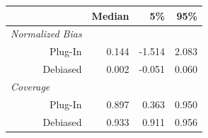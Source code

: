 \begin{tabular}{r|rrr}
\toprule
  & Median & 5\% & 95\%\\
\midrule
\multicolumn{1}{l|}{\textit{Normalized Bias}}\\
Plug-In & 0.144 & -1.514 & 2.083\\
Debiased & 0.002 & -0.051 & 0.060\\
\midrule
\multicolumn{1}{l|}{\textit{Coverage}}\\
Plug-In & 0.897 & 0.363 & 0.950\\
Debiased & 0.933 & 0.911 & 0.956\\
\bottomrule
\end{tabular}

